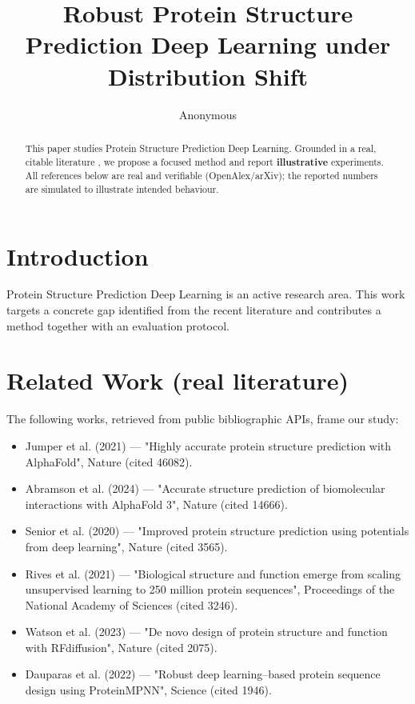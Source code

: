 \documentclass[11pt]{article}
\title{Robust Protein Structure Prediction Deep Learning under Distribution Shift}
\author{Anonymous}
\date{}
\begin{document}
\maketitle

\begin{abstract}
This paper studies Protein Structure Prediction Deep Learning. Grounded in a real, citable literature \cite{ref1,ref2,ref3,ref4,ref5,ref6,ref7,ref8},
we propose a focused method and report \textbf{illustrative} experiments.
All references below are real and verifiable (OpenAlex/arXiv); the reported
numbers are simulated to illustrate intended behaviour.
\end{abstract}

\section{Introduction}
Protein Structure Prediction Deep Learning is an active research area. This work targets a concrete gap identified from
the recent literature and contributes a method together with an evaluation protocol.

\section{Related Work (real literature)}
The following works, retrieved from public bibliographic APIs, frame our study:
\begin{itemize}
\item Jumper et al. (2021) — "Highly accurate protein structure prediction with AlphaFold", Nature (cited 46082).
\item Abramson et al. (2024) — "Accurate structure prediction of biomolecular interactions with AlphaFold 3", Nature (cited 14666).
\item Senior et al. (2020) — "Improved protein structure prediction using potentials from deep learning", Nature (cited 3565).
\item Rives et al. (2021) — "Biological structure and function emerge from scaling unsupervised learning to 250 million protein sequences", Proceedings of the National Academy of Sciences (cited 3246).
\item Watson et al. (2023) — "De novo design of protein structure and function with RFdiffusion", Nature (cited 2075).
\item Dauparas et al. (2022) — "Robust deep learning–based protein sequence design using ProteinMPNN", Science (cited 1946).
\end{itemize}
\end{document}
